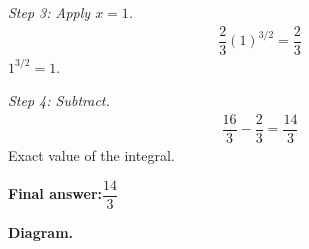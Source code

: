 \documentclass[11pt]{article}
\begin{document}
\textit{Step 3: Apply \( x = 1 \).}
\[\begin{gathered}
\dfrac{2}{3}(1)^{3/2} = \dfrac{2}{3}
\end{gathered}\]
\( 1^{3/2} = 1 \).

\textit{Step 4: Subtract.}
\[\begin{gathered}
\dfrac{16}{3} - \dfrac{2}{3} = \dfrac{14}{3}
\end{gathered}\]
Exact value of the integral.

\begin{answerbox}
\textbf{Final answer:}\quad \(\displaystyle \dfrac{14}{3}\)
\end{answerbox}
\textbf{Diagram.}

\begin{center}
\end{center}
\end{document}
